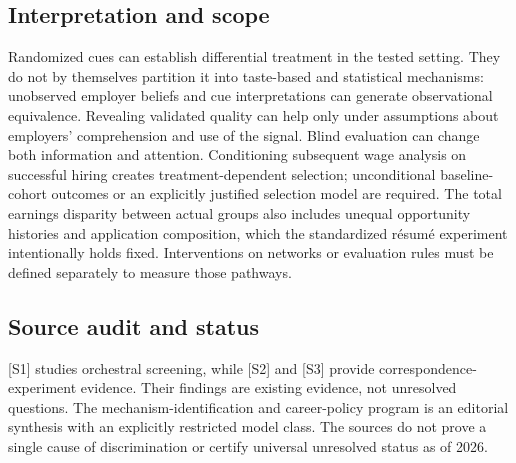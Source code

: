 \documentclass[11pt,a4paper]{article}
\begin{document}
\subsection*{Interpretation and scope}
Randomized cues can establish differential treatment in the tested setting. They do not by themselves partition it into taste-based and statistical mechanisms: unobserved employer beliefs and cue interpretations can generate observational equivalence. Revealing validated quality can help only under assumptions about employers' comprehension and use of the signal. Blind evaluation can change both information and attention. Conditioning subsequent wage analysis on successful hiring creates treatment-dependent selection; unconditional baseline-cohort outcomes or an explicitly justified selection model are required. The total earnings disparity between actual groups also includes unequal opportunity histories and application composition, which the standardized résumé experiment intentionally holds fixed. Interventions on networks or evaluation rules must be defined separately to measure those pathways.
\subsection*{Source audit and status}
[S1] studies orchestral screening, while [S2] and [S3] provide correspondence-experiment evidence. Their findings are existing evidence, not unresolved questions. The mechanism-identification and career-policy program is an editorial synthesis with an explicitly restricted model class. The sources do not prove a single cause of discrimination or certify universal unresolved status as of 2026.
\end{document}
